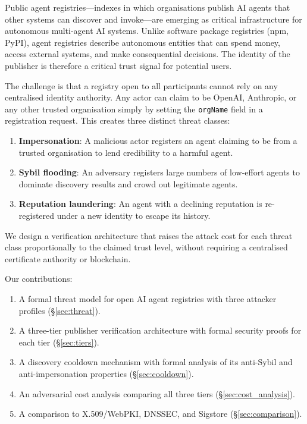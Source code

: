 \documentclass[conference]{IEEEtran}
\begin{document}
Public agent registries—indexes in which organisations
publish AI agents that other systems can discover and
invoke—are emerging as critical infrastructure for
autonomous multi-agent AI systems.  Unlike software package
registries (npm, PyPI), agent registries describe autonomous
entities that can spend money, access external systems, and
make consequential decisions. The identity of the publisher
is therefore a critical trust signal for potential users.

The challenge is that a registry open to all participants
cannot rely on any centralised identity authority.  Any
actor can claim to be OpenAI, Anthropic, or any other
trusted organisation simply by setting the \texttt{orgName}
field in a registration request.  This creates three distinct
threat classes:

\begin{enumerate}
  \item \textbf{Impersonation}: A malicious actor registers
    an agent claiming to be from a trusted organisation to
    lend credibility to a harmful agent.
  \item \textbf{Sybil flooding}: An adversary registers
    large numbers of low-effort agents to dominate discovery
    results and crowd out legitimate agents.
  \item \textbf{Reputation laundering}: An agent with a
    declining reputation is re-registered under a new
    identity to escape its history.
\end{enumerate}

We design a verification architecture that raises the
attack cost for each threat class proportionally to the
claimed trust level, without requiring a centralised
certificate authority or blockchain.

Our contributions:
\begin{enumerate}
  \item A formal threat model for open AI agent registries
    with three attacker profiles (\S\ref{sec:threat}).
  \item A three-tier publisher verification architecture
    with formal security proofs for each tier
    (\S\ref{sec:tiers}).
  \item A discovery cooldown mechanism with formal analysis
    of its anti-Sybil and anti-impersonation properties
    (\S\ref{sec:cooldown}).
  \item An adversarial cost analysis comparing all three
    tiers (\S\ref{sec:cost_analysis}).
  \item A comparison to X.509/WebPKI, DNSSEC, and Sigstore
    (\S\ref{sec:comparison}).
\end{enumerate}
\end{document}
